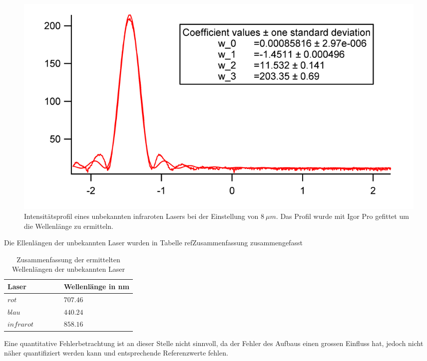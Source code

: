 \begin{figure}[H]	\centering	
	\begin{minipage}{1\textwidth}
		\includegraphics[width=\columnwidth]{180618/Graph_IR.png}
	\end{minipage}
	\caption{Intensitätsprofil eines unbekannten infraroten Lasers bei der Einstellung von $8~\mu m$. Das Profil wurde mit Igor Pro gefittet um die Wellenlänge zu ermitteln. }
	\label{U_IR}
\end{figure}
Die Ellenlängen der unbekannten Laser wurden in Tabelle ref{Zusammenfassung} zusammengefasst
\begin{table}[H]
\centering
\label{Zusammenfassung}
	\caption{Zusammenfassung der ermittelten Wellenlängen der unbekannten Laser }
	\begin{tabular}{C{0.15\linewidth}|C{0.15\linewidth}}
		Laser & Wellenlänge in nm\\
		\hline \addlinespace[1ex] 
		$ rot $ & $707.46$\\
		$ blau $ & $440.24$\\
		$ infrarot $ & $858.16$\\
	\end{tabular}
\end{table}

Eine quantitative Fehlerbetrachtung ist an dieser Stelle nicht sinnvoll, da der Fehler des Aufbaus einen grossen Einfluss hat, jedoch nicht näher quantifiziert werden kann und entsprechende Referenzwerte fehlen. 

%